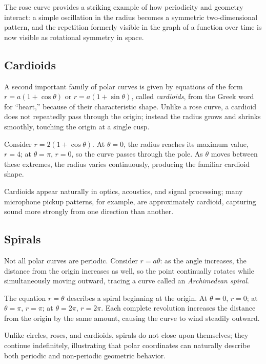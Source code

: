 The rose curve provides a striking example of how periodicity and
geometry interact: a simple oscillation in the radius becomes a symmetric
two-dimensional pattern, and the repetition formerly visible in the graph
of a function over time is now visible as rotational symmetry in space.

\subsection*{Cardioids}

A second important family of polar curves is given by equations of the
form $r = a(1+\cos\theta)$ or $r = a(1+\sin\theta)$, called
\emph{cardioids}, from the Greek word for ``heart,'' because of their
characteristic shape. Unlike a rose curve, a cardioid does not repeatedly
pass through the origin; instead the radius grows and shrinks smoothly,
touching the origin at a single cusp.

\begin{example}
Consider $r = 2(1+\cos\theta)$. At $\theta = 0$, the radius reaches its
maximum value, $r = 4$; at $\theta = \pi$, $r = 0$, so the curve passes
through the pole. As $\theta$ moves between these extremes, the radius
varies continuously, producing the familiar cardioid shape.
\end{example}

Cardioids appear naturally in optics, acoustics, and signal processing;
many microphone pickup patterns, for example, are approximately
cardioid, capturing sound more strongly from one direction than another.

\subsection*{Spirals}

Not all polar curves are periodic. Consider $r = a\theta$: as the angle
increases, the distance from the origin increases as well, so the point
continually rotates while simultaneously moving outward, tracing a curve
called an \emph{Archimedean spiral}.

\begin{example}
The equation $r = \theta$ describes a spiral beginning at the origin. At
$\theta=0$, $r=0$; at $\theta=\pi$, $r=\pi$; at $\theta=2\pi$, $r=2\pi$.
Each complete revolution increases the distance from the origin by the
same amount, causing the curve to wind steadily outward.
\end{example}

Unlike circles, roses, and cardioids, spirals do not close upon
themselves; they continue indefinitely, illustrating that polar
coordinates can naturally describe both periodic and non-periodic
geometric behavior.

